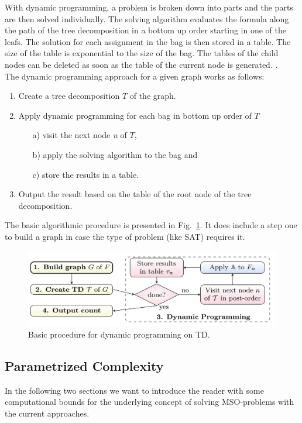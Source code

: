 \documentclass[a4paper, 12pt, bibliography=totoc]{scrartcl}
\begin{document}
With dynamic programming, a problem is broken down into parts and the parts are then solved individually. The solving algorithm evaluates the formula along the path of the tree decomposition in a bottom up order starting in one of the leafs. The solution for each assignment in the bag is then stored in a table. The size of the table is exponential to the size of the bag. The tables of the child nodes can be deleted as soon as the table of the current node is generated. \cite[Ch. 3.1]{DiplomarbeitZisser}.\\

The dynamic programming approach for a given graph works as follows:
\begin{enumerate}
	\filbreak
	\item Create a tree decomposition ${T}$ of the graph.
	\item Apply dynamic programming for each bag in bottom up order of ${T}$
	\begin{itemize}
		\item[a)] visit the next node \textit{n} of ${T}$,
		\item[b)] apply the solving algorithm to the bag and
		\item[c)] store the results in a table.
	\end{itemize}
	\item Output the result based on the table of the root node of the tree decomposition.
\end{enumerate}

The basic algorithmic procedure is presented in Fig.~\ref{fig:dpalgo}. It does include a step one to build a graph in case the type of problem (like SAT) requires it.
\begin{figure}[h]
	\centering
	\includegraphics{images/DPAlgo31.png}
	\caption{ Basic procedure for dynamic programming on TD. \cite[Figure~3.1]{DiplomarbeitZisser} }
	\label{fig:dpalgo}
\end{figure}


\subsection{Parametrized Complexity}
In the following two sections we want to introduce the reader with some computational bounds for the underlying concept of solving MSO-problems with the current approaches.
\end{document}

